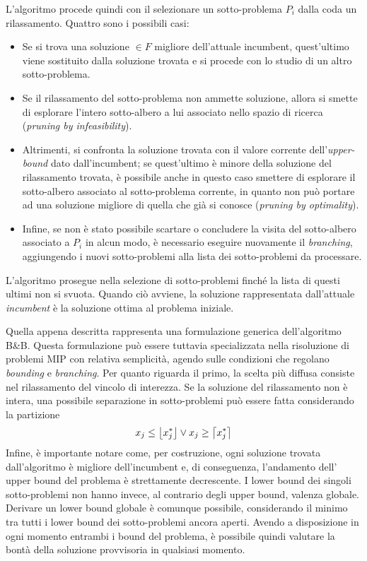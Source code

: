 L'algoritmo procede quindi con il selezionare un sotto-problema $P_i$ dalla coda un rilassamento. Quattro sono i possibili casi:
\begin{itemize}
\itemsep-0.5em 
\item Se si trova una soluzione $\in F$ migliore dell'attuale incumbent, quest'ultimo viene 
sostituito dalla soluzione trovata e si procede con lo studio di un altro sotto-problema.
\item Se il rilassamento del sotto-problema non ammette soluzione, allora si smette di esplorare l'intero sotto-albero a lui associato 
nello spazio di ricerca (\textit{pruning by infeasibility}).
\item Altrimenti, si confronta la soluzione trovata con il valore corrente dell'\textit{upper-bound} dato dall'incumbent; se
quest'ultimo è minore
della soluzione del rilassamento trovata, è possibile anche in questo caso smettere di esplorare il sotto-albero associato al
sotto-problema corrente,
in quanto non può portare ad una soluzione migliore di quella che già si conosce (\textit{pruning by optimality}).
\item Infine, se non è stato possibile scartare o concludere la visita del sotto-albero associato a $P_i$ in alcun modo, è necessario
eseguire nuovamente il \textit{branching}, aggiungendo i nuovi sotto-problemi alla lista dei sotto-problemi da processare.
\end{itemize}
L'algoritmo prosegue nella selezione di sotto-problemi finché la lista di questi ultimi non si svuota. Quando ciò avviene, la soluzione
rappresentata dall'attuale \textit{incumbent} è la soluzione ottima al problema iniziale.

Quella appena descritta rappresenta una formulazione generica dell'algoritmo B\&B. Questa formulazione può essere
tuttavia specializzata nella risoluzione di problemi MIP con relativa semplicità, agendo sulle condizioni che regolano 
\textit{bounding} e \textit{branching}. Per quanto riguarda il primo, la scelta più diffusa consiste nel rilassamento del vincolo di interezza.
Se la soluzione del rilassamento non è intera, una possibile separazione in sotto-problemi può essere fatta considerando la partizione
\begin{align*}
x_j \leq \floor*{x_j^*} \vee x_j \geq \ceil*{x_j^*}
\end{align*}
\indent
Infine, è importante notare come, per costruzione, ogni soluzione trovata dall'algoritmo è migliore dell'incumbent e, di conseguenza, l'andamento dell'
upper bound del problema è strettamente decrescente. I lower bound dei singoli sotto-problemi non hanno invece, al contrario degli 
upper bound, valenza globale. Derivare un lower bound globale è comunque possibile, considerando il minimo tra tutti
i lower bound dei sotto-problemi ancora aperti. Avendo a disposizione in ogni momento entrambi i bound del problema, 
è possibile quindi valutare la bontà della soluzione provvisoria in qualsiasi momento. 

